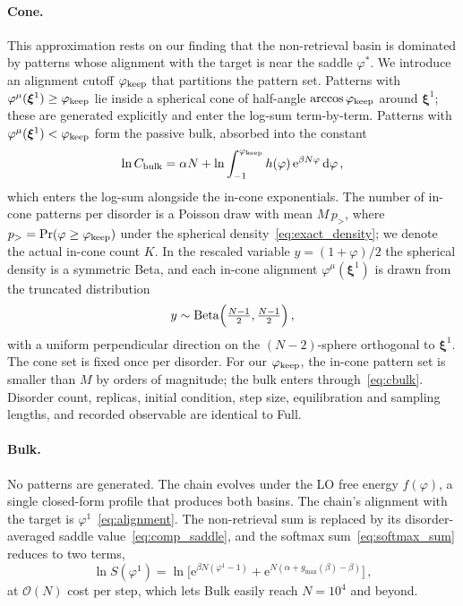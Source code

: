 \documentclass[letterpaper]{article} %
\newcommand{\bxi}{\boldsymbol{\xi}}
\newcommand{\e}{{\mathrm{e}}}
\newcommand{\dd}{{\mathrm{d}}}
\newcommand{\Bnet}{\beta}
\newcommand{\gmax}{g_{\max}}
\begin{document}
\paragraph{Cone.}
This approximation rests on our finding that the non-retrieval basin is dominated by patterns whose alignment with the target is near the saddle $\varphi^*$. We introduce an alignment cutoff $\varphi_{\rm keep}$ that partitions the pattern set. Patterns with $\varphi^\mu(\bxi^1) \geq \varphi_{\rm keep}$ lie inside a spherical cone of half-angle $\arccos \varphi_{\rm keep}$ around $\bxi^1$; these are generated explicitly and enter the log-sum term-by-term. Patterns with $\varphi^\mu(\bxi^1) < \varphi_{\rm keep}$ form the passive bulk, absorbed into the constant
\begin{equation}
    \ln C_{\rm bulk} = \alpha N + \ln\int_{-1}^{\varphi_{\rm keep}} h(\varphi)\,\e^{\Bnet N \varphi}\,\dd\varphi\,,
    \label{eq:cbulk}
\end{equation}
which enters the log-sum alongside the in-cone exponentials. The number of in-cone patterns per disorder is a Poisson draw with mean $M\,p_{>}$, where $p_{>} = \Pr(\varphi \geq \varphi_{\rm keep})$ under the spherical density~\eqref{eq:exact_density}; we denote the actual in-cone count $K$. In the rescaled variable $y = (1 + \varphi)/2$ the spherical density is a symmetric Beta, and each in-cone alignment $\varphi^\mu(\bxi^1)$ is drawn from the truncated distribution
\begin{equation}
    y \sim \mathrm{Beta} \Bigl(\tfrac{N-1}{2}, \tfrac{N-1}{2}\Bigr)\,,
    \label{eq:beta-tail}
\end{equation}
with a uniform perpendicular direction on the $(N{-}2)$-sphere orthogonal to $\bxi^1$. The cone set is fixed once per disorder. For our $\varphi_{\rm keep}$, the in-cone pattern set is smaller than $M$ by orders of magnitude; the bulk enters through~\eqref{eq:cbulk}. Disorder count, replicas, initial condition, step size, equilibration and sampling lengths, and recorded observable are identical to Full. 

\paragraph{Bulk.}
No patterns are generated. The chain evolves under the LO free energy $f(\varphi)$, a single closed-form profile that produces both basins. The chain's alignment with the target is $\varphi^1$~\eqref{eq:alignment}. The non-retrieval sum is replaced by its disorder-averaged saddle value~\eqref{eq:comp_saddle}, and the softmax sum~\eqref{eq:softmax_sum} reduces to two terms,
\begin{equation}
	\ln S(\varphi^1) = \ln \bigl[\e^{\Bnet N(\varphi^1 - 1)} + \e^{N(\alpha + \gmax(\Bnet) - \Bnet)}\bigr]\,,
	\label{eq:bulk-logS}
\end{equation}
at $\mathcal{O}(N)$ cost per step, which lets Bulk easily reach $N = 10^4$ and beyond.
\end{document}
